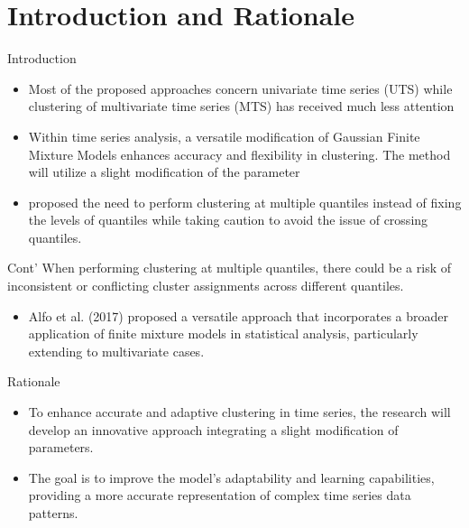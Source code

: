 \documentclass[unknownkeysallowed]{beamer}
\begin{document}
\section{Introduction and Rationale}
\begin{frame}{Introduction}
	\begin{itemize}
		\item Most of the proposed approaches concern univariate time series (UTS) while clustering of multivariate time series (MTS) has received much less attention \citep{lopez2022quantile} 
		
		\item Within time series analysis, a versatile modification of Gaussian Finite Mixture Models enhances accuracy and flexibility in clustering. The method will utilize a slight modification of the parameter \cite{lopez2021quantile}
		
		\item \cite{musau2022clustering} proposed the need to perform clustering at multiple quantiles instead of fixing the levels of quantiles while taking caution to avoid the issue of crossing quantiles.
		
	\end{itemize}
\end{frame}

	
\begin{frame}{Cont'}
	When performing clustering at multiple quantiles, there could be a risk of inconsistent or conflicting cluster assignments across different quantiles.
	\begin{itemize}
		
		\item Alfo et al. (2017) proposed a versatile approach that incorporates a broader application of finite mixture models in statistical analysis, particularly extending to multivariate cases.
	\end{itemize}
\end{frame}


\begin{frame}{Rationale}
	\begin{itemize}
		\item To enhance accurate and adaptive clustering in time series, the research will develop an innovative approach integrating a slight modification of parameters.
		
		\item The goal is to improve the model's adaptability and learning capabilities, providing a more accurate representation of complex time series data patterns.
	\end{itemize}
\end{frame}
\end{document}

